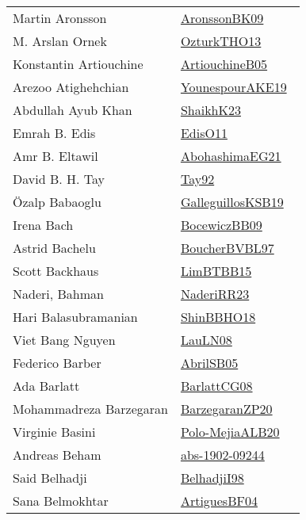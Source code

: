 {\begin{longtable}{p{4cm}p{20cm}}
Martin Aronsson & \href{works/AronssonBK09.pdf}{AronssonBK09}~\cite{AronssonBK09}\\
M. Arslan Ornek & \href{works/OzturkTHO13.pdf}{OzturkTHO13}~\cite{OzturkTHO13}\\
Konstantin Artiouchine & \href{works/ArtiouchineB05.pdf}{ArtiouchineB05}~\cite{ArtiouchineB05}\\
Arezoo Atighehchian & \href{works/YounespourAKE19.pdf}{YounespourAKE19}~\cite{YounespourAKE19}\\
Abdullah Ayub Khan & \href{works/ShaikhK23.pdf}{ShaikhK23}~\cite{ShaikhK23}\\
Emrah B. Edis & \href{works/EdisO11.pdf}{EdisO11}~\cite{EdisO11}\\
Amr B. Eltawil & \href{works/AbohashimaEG21.pdf}{AbohashimaEG21}~\cite{AbohashimaEG21}\\
David B. H. Tay & \href{}{Tay92}~\cite{Tay92}\\
{\"{O}}zalp Babaoglu & \href{works/GalleguillosKSB19.pdf}{GalleguillosKSB19}~\cite{GalleguillosKSB19}\\
Irena Bach & \href{works/BocewiczBB09.pdf}{BocewiczBB09}~\cite{BocewiczBB09}\\
Astrid Bachelu & \href{}{BoucherBVBL97}~\cite{BoucherBVBL97}\\
Scott Backhaus & \href{works/LimBTBB15.pdf}{LimBTBB15}~\cite{LimBTBB15}\\
Naderi, Bahman & \href{works/NaderiRR23.pdf}{NaderiRR23}~\cite{NaderiRR23}\\
Hari Balasubramanian & \href{works/ShinBBHO18.pdf}{ShinBBHO18}~\cite{ShinBBHO18}\\
Viet Bang Nguyen & \href{works/LauLN08.pdf}{LauLN08}~\cite{LauLN08}\\
Federico Barber & \href{works/AbrilSB05.pdf}{AbrilSB05}~\cite{AbrilSB05}\\
Ada Barlatt & \href{works/BarlattCG08.pdf}{BarlattCG08}~\cite{BarlattCG08}\\
Mohammadreza Barzegaran & \href{works/BarzegaranZP20.pdf}{BarzegaranZP20}~\cite{BarzegaranZP20}\\
Virginie Basini & \href{works/Polo-MejiaALB20.pdf}{Polo-MejiaALB20}~\cite{Polo-MejiaALB20}\\
Andreas Beham & \href{works/abs-1902-09244.pdf}{abs-1902-09244}~\cite{abs-1902-09244}\\
Said Belhadji & \href{works/BelhadjiI98.pdf}{BelhadjiI98}~\cite{BelhadjiI98}\\
Sana Belmokhtar & \href{works/ArtiguesBF04.pdf}{ArtiguesBF04}~\cite{ArtiguesBF04}\\

\end{longtable}}
